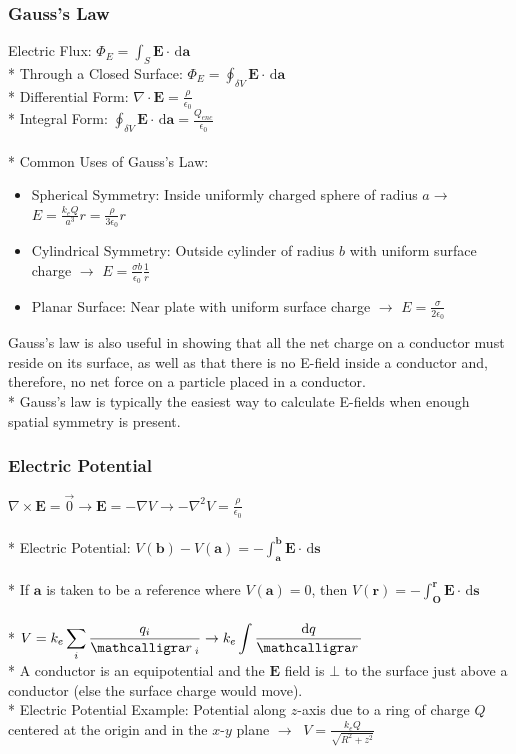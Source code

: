 \subsubsection{Gauss's Law}
Electric Flux: \(\Phi_E=\int_S\mathbf{E}\cdot\,\mathrm{d}\mathbf{a}\)\\*
Through a Closed Surface: \(\displaystyle\Phi_E=\oint_{\delta V}\mathbf{E}\cdot\,\mathrm{d}\mathbf{a}\)\\*
Differential Form: \(\nabla\cdot\mathbf{E}=\displaystyle\frac{\rho}{\epsilon_0}\)\\*
Integral Form: \(\displaystyle\oint_{\delta V}\mathbf{E}\cdot\,\mathrm{d}\mathbf{a}=\frac{Q_{enc}}{\epsilon_0}\)\\\\*
Common Uses of Gauss's Law:
\begin{itemize}
\item Spherical Symmetry: Inside uniformly charged sphere of radius \(a \to\) \(\displaystyle E=\frac{k_eQ}{a^3}r=\frac{\rho}{3\epsilon_0}r\)
\item Cylindrical Symmetry: Outside cylinder of radius \(b\) with uniform surface charge \(\to\) \(\displaystyle E=\frac{\sigma b}{\epsilon_0}\frac{1}{r}\)
\item Planar Surface: Near plate with uniform surface charge \(\to\) \(\displaystyle E=\frac{\sigma}{2\epsilon_0}\)
\end{itemize}
Gauss's law is also useful in showing that all the net charge on a conductor must reside on its surface, as well as that there is no E-field inside a conductor and, therefore, no net force on a particle placed in a conductor.\\*
Gauss's law is typically the easiest way to calculate E-fields when enough spatial symmetry is present.

\newpage
\subsubsection{Electric Potential}
\(\nabla\times\mathbf{E}=\vec{0}\to\mathbf{E}=-\nabla V \to -\nabla^2 V=\displaystyle\frac{\rho}{\epsilon_0}\)\\\\*
Electric Potential: \(\displaystyle V(\mathbf{b})-V(\mathbf{a})= -\int_\mathbf{a}^\mathbf{b}\mathbf{E}\cdot\,\mathrm{d}\mathbf{s}\)\\\\*
If \(\mathbf{a}\) is taken to be a reference where \(V(\mathbf{a})=0\), then \(\displaystyle V(\mathbf{r})= -\int_\mathbf{O}^\mathbf{r}\mathbf{E}\cdot\,\mathrm{d}\mathbf{s}\)\\\\*
\(\displaystyle V=k_e\sum_i\frac{q_i}{\scriptr_i} \to k_e\int\frac{\mathrm{d}q}{\scriptr}\)\\*
A conductor is an equipotential and the \(\mathbf{E}\) field is \(\bot\) to the surface just above a conductor (else the surface charge would move).\\*
Electric Potential Example: Potential along \(z\)-axis due to a ring of charge \(Q\) centered at the origin and in the \(x\)-\(y\) plane \(\to\) \(\displaystyle\ V=\frac{k_eQ}{\sqrt{R^2+z^2}}\)

